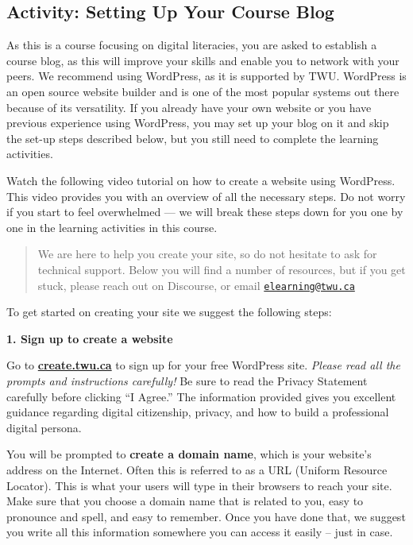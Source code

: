 \documentclass[
]{book}
\theoremstyle{definition}
\theoremstyle{definition}
\theoremstyle{definition}
\theoremstyle{definition}
\theoremstyle{remark}
\begin{document}
\hypertarget{activity-setting-up-your-course-blog}{%
\subsection*{Activity: Setting Up Your Course Blog}\label{activity-setting-up-your-course-blog}}

\begin{reflect}
As this is a course focusing on digital literacies, you are asked to establish a course blog, as this will improve your skills and enable you to network with your peers. We recommend using WordPress, as it is supported by TWU. WordPress is an open source website builder and is one of the most popular systems out there because of its versatility. If you already have your own website or you have previous experience using WordPress, you may set up your blog on it and skip the set-up steps described below, but you still need to complete the learning activities.

Watch the following video tutorial on how to create a website using WordPress. This video provides you with an overview of all the necessary steps. Do not worry if you start to feel overwhelmed --- we will break these steps down for you one by one in the learning activities in this course.

\begin{quote}
We are here to help you create your site, so do not hesitate to ask for technical support. Below you will find a number of resources, but if you get stuck, please reach out on Discourse, or email \href{mailto:elearning@twu.ca}{\nolinkurl{elearning@twu.ca}}
\end{quote}

To get started on creating your site we suggest the following steps:

\textbf{1. Sign up to create a website}

Go to \textbf{\href{https://create.twu.ca/}{create.twu.ca}} to sign up for your free WordPress site. \emph{Please read all the prompts and instructions carefully!}
Be sure to read the Privacy Statement carefully before clicking ``I Agree.'' The information provided gives you excellent guidance regarding digital citizenship, privacy, and how to build a professional digital persona.

You will be prompted to \textbf{create a domain name}, which is your website's address on the Internet. Often this is referred to as a URL (Uniform Resource Locator). This is what your users will type in their browsers to reach your site. Make sure that you choose a domain name that is related to you, easy to pronounce and spell, and easy to remember. Once you have done that, we suggest you write all this information somewhere you can access it easily -- just in case.


\end{reflect}
\end{document}
